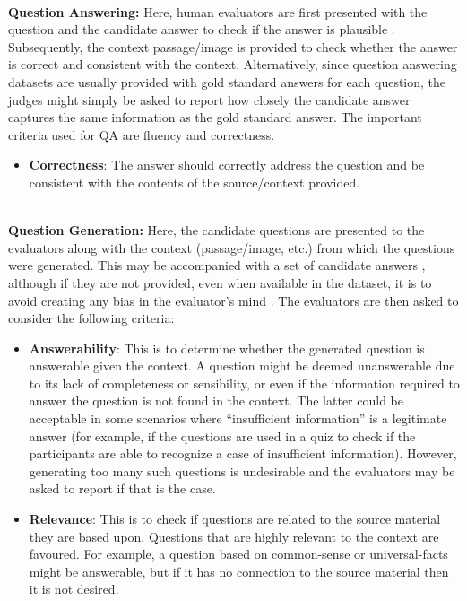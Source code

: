 ~\\
\textbf{Question Answering:} Here, human evaluators are first presented with the question and the candidate answer to check if the answer is plausible . Subsequently, the context passage/image is provided to check whether the answer is correct and consistent with the context. Alternatively, since question answering datasets are usually provided with gold standard answers for each question, the judges might simply be asked to report how closely the candidate answer captures the same information as the gold standard answer. The important criteria used for QA are fluency and correctness. 
\begin{itemize}
    \item \textbf{Correctness}: The answer should correctly address the question and be consistent with the contents of the source/context provided.
\end{itemize}
~\\
\textbf{Question Generation:} Here, the candidate questions are presented to the evaluators along with the context (passage/image, etc.) from which the questions were generated. This may be accompanied with a set of candidate answers , although if they are not provided, even when available in the dataset, it is to avoid creating any bias in the evaluator's mind . The evaluators are then asked to consider the following criteria:
\begin{itemize}
    \item \textbf{Answerability}: This is to determine whether the generated question is answerable given the context. A question might be deemed unanswerable due to its lack of completeness or sensibility, or even if the information required to answer the question is not found in the context. The latter could be acceptable in some scenarios where ``insufficient information'' is a legitimate answer (for example, if the questions are used in a quiz to check if the participants are able to recognize a case of insufficient information). However, generating too many such questions is undesirable and the evaluators may be asked to report if that is the case. 
    \item \textbf{Relevance}: This is to check if questions are related to the source material they are based upon. Questions that are highly relevant to the context are favoured. For example, a question based on common-sense or universal-facts might be answerable, but if it has no connection to the source material then it is not desired.
    \end{itemize}

